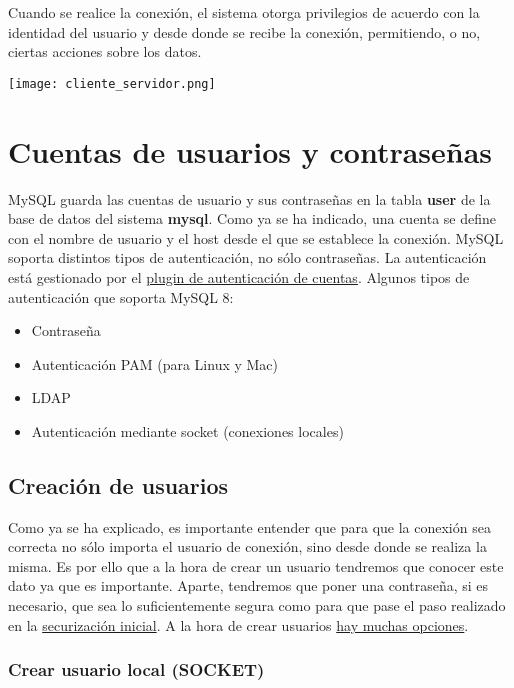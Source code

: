 Cuando se realice la conexión, el sistema otorga privilegios de acuerdo con la  identidad del usuario y desde donde se recibe la conexión, permitiendo, o no, ciertas acciones sobre los datos.

\begin{center}
    \vspace{-10pt}
    \texttt{[image: cliente\_servidor.png]}
\end{center}


\section{Cuentas de usuarios y contraseñas}
MySQL guarda las cuentas de usuario y sus contraseñas en la tabla \textbf{user} de la base de datos del sistema \textbf{mysql}. Como ya se ha indicado, una cuenta se define con el nombre de usuario y el host desde el que se establece la conexión. MySQL soporta distintos tipos de autenticación, no sólo contraseñas. La autenticación está gestionado por el \href{https://dev.mysql.com/doc/refman/8.0/en/authentication-plugins.html}{plugin de autenticación de cuentas}. Algunos tipos de autenticación que soporta MySQL 8:

\begin{itemize}
    \item Contraseña
    \item Autenticación PAM (para Linux y Mac)
    \item LDAP
    \item Autenticación mediante socket (conexiones locales)
\end{itemize}


\subsection{Creación de usuarios}
Como ya se ha explicado, es importante entender que para que la conexión sea correcta no sólo importa el usuario de conexión, sino desde donde se realiza la misma. Es por ello que a la hora de crear un usuario tendremos que conocer este dato ya que es importante. Aparte, tendremos que poner una contraseña, si es necesario, que sea lo suficientemente segura como para que pase el paso realizado en la \hyperlink{securizar_configuracion_inicial}{securización inicial}. A la hora de crear usuarios \href{https://dev.mysql.com/doc/refman/8.0/en/create-user.html}{hay muchas opciones}.


\subsubsection*{Crear usuario local (SOCKET)}

